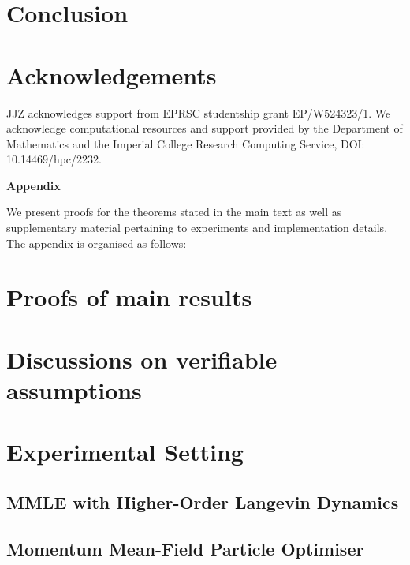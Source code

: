 \documentclass{article}
\begin{document}
\section{Conclusion}\label{sec:conclusion}


\section*{Acknowledgements}
JJZ acknowledges support from EPRSC studentship grant EP/W524323/1. We acknowledge computational resources and support provided by the Department of
Mathematics and the Imperial College Research Computing
Service, DOI: 10.14469/hpc/2232.







\newpage
\appendix

\makeatletter
\newcommand{\appendixpropformat}{%
\setcounter{figure}{0}
\setcounter{table}{0}
\setcounter{theorem}{0}
\setcounter{lemma}{0}
\setcounter{proposition}{0}
\setcounter{corollary}{0}
\setcounter{remark}{0}
\setcounter{assumption}{0}
\renewcommand{\thefigure}{A.\arabic{figure}}
\renewcommand{\thetheorem}{A.\arabic{theorem}}
\renewcommand{\thelemma}{A.\arabic{lemma}}
\renewcommand{\theproposition}{A.\arabic{proposition}}
\renewcommand{\thecorollary}{A.\arabic{corollary}}
\renewcommand{\theremark}{A.\arabic{remark}}
\renewcommand{\thetable}{A.\arabic{table}}
\renewcommand{\theassumption}{U\arabic{assumption}}
}
\begin{center}
    {\LARGE \textbf{Appendix}}
\end{center}
\appendixpropformat

We present proofs for the theorems stated in the main text as well as supplementary material pertaining to experiments and implementation details. The appendix is organised as follows:

\startcontents
{}

\makeatother
\newpage

\section{Proofs of main results}\label{app:proofs}


\section{Discussions on verifiable assumptions}\label{app:assumptions}


\section{Experimental Setting}

\subsection{\textsc{\small MMLE} with Higher-Order Langevin Dynamics}\label{app:mmle_details}


\subsection{Momentum Mean-Field Particle Optimiser}\label{app:mmfpo_details}

\end{document}

